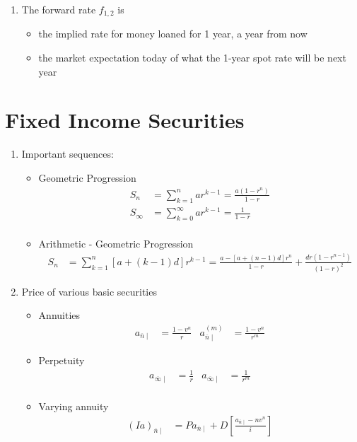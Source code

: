 \documentclass[12pt,twoside]{article}
\begin{document}
\begin{enumerate}
\item The forward rate $f_{1,2}$ is 
\begin{itemize}
\item the implied rate for money loaned for 1 year, a year from now
\item the market expectation today of what the 1-year spot rate will be next year
\end{itemize}

\end{enumerate}

\newpage


\section {Fixed Income Securities}
\begin{enumerate}
	\item Important sequences:
		\begin{itemize}
			\item Geometric Progression
				\begin{align*}
					S_n &= \sum_{k=1}^n ar^{k-1}  =\frac{a(1-r^n)}{1-r}\\
					S_\infty &= \sum_{k=0}^\infty ar^{k-1} = \frac{1}{1-r}\\
				\end{align*}
			\item Arithmetic - Geometric Progression
				\begin{align*}
					S_n & = \sum_{k=1}^n\left[a + (k-1)d\right]r^{k-1}= \frac{a-\left[a+(n-1)d\right]r^n}{1-r}+\frac{dr(1-r^{n-1})}{(1-r)^2}
				\end{align*}
			\end{itemize}
	
	\item Price of various basic securities
		\begin{itemize}
			\item Annuities
				\begin{align*}
					a_{\overline{n}\mid} & = \frac{1-v^n}{r} &
					a_{\overline{n}\mid}^{(m)} & = \frac{1-v^n}{r^{m}}
				\end{align*}
			\item Perpetuity
				\begin{align*}
					a_{\overline{\infty}\mid} & = \frac{1}{r}&
					a_{\overline{\infty}\mid} & = \frac{1}{r^{m}}\\
				\end{align*}
				
			\item  Varying annuity
				\begin{align*}
					(Ia)_{\overline{n}\mid} & = Pa_{\overline{n}\mid} + D\left[\frac{a_{\overline{n}\mid} - nv^n}{i}\right]
				\end{align*}
				

\end{itemize}
\end{enumerate}
\end{document}
